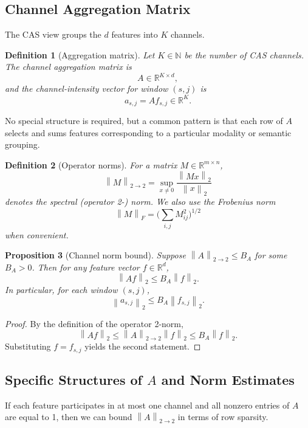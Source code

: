 \documentclass[11pt]{article}
\newtheorem{definition}{Definition}[section]
\newtheorem{proposition}[definition]{Proposition}
\newcommand{\R}{\mathbb{R}}
\newcommand{\N}{\mathbb{N}}
\newcommand{\norm}[1]{\left\lVert #1 \right\rVert}
\begin{document}
\subsection{Channel Aggregation Matrix}

The CAS view groups the \(d\) features into \(K\) channels.

\begin{definition}[Aggregation matrix]
Let \(K \in \N\) be the number of CAS channels.
The channel aggregation matrix is
\[
  A \in \R^{K \times d},
\]
and the channel-intensity vector for window \((s,j)\) is
\[
  a_{s,j} = A f_{s,j} \in \R^K.
\]
\end{definition}

No special structure is required, but a common pattern is that each row of \(A\) selects and sums features corresponding to a particular modality or semantic grouping.

\begin{definition}[Operator norms]
For a matrix \(M \in \R^{m \times n}\),
\[
  \norm{M}_{2\to 2} = \sup_{x \ne 0} \frac{\norm{M x}_2}{\norm{x}_2}
\]
denotes the spectral (operator 2-) norm. We also use the Frobenius norm
\[
  \norm{M}_F = \biggl( \sum_{i,j} M_{ij}^2 \biggr)^{1/2}
\]
when convenient.
\end{definition}

\begin{proposition}[Channel norm bound]
Suppose \(\norm{A}_{2\to 2} \le B_A\) for some \(B_A > 0\).
Then for any feature vector \(f \in \R^d\),
\[
  \norm{A f}_2 \le B_A \norm{f}_2.
\]
In particular, for each window \((s,j)\),
\[
  \norm{a_{s,j}}_2 \le B_A \norm{f_{s,j}}_2.
\]
\end{proposition}

\begin{proof}
By the definition of the operator 2-norm,
\[
  \norm{A f}_2 \le \norm{A}_{2\to2} \norm{f}_2 \le B_A \norm{f}_2.
\]
Substituting \(f = f_{s,j}\) yields the second statement.
\end{proof}

\subsection{Specific Structures of \texorpdfstring{$A$}{A} and Norm Estimates}

If each feature participates in at most one channel and all nonzero entries of \(A\) are equal to 1, then we can bound \(\norm{A}_{2\to2}\) in terms of row sparsity.
\end{document}
